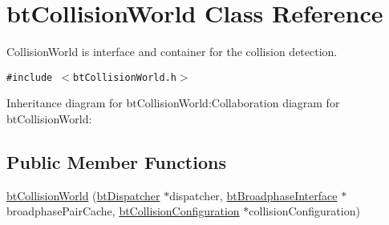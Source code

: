 \hypertarget{classbt_collision_world}{
\section{btCollisionWorld Class Reference}
\label{classbt_collision_world}
}
CollisionWorld is interface and container for the collision detection.  


{\tt \#include $<$btCollisionWorld.h$>$}

Inheritance diagram for btCollisionWorld:Collaboration diagram for btCollisionWorld:\subsection*{Public Member Functions}
\begin{CompactItemize}
\item 
\hypertarget{classbt_collision_world_6d2c3ec40c17296308c2b229ae3962ea}{
\hyperlink{classbt_collision_world_6d2c3ec40c17296308c2b229ae3962ea}{btCollisionWorld} (\hyperlink{classbt_dispatcher}{btDispatcher} $\ast$dispatcher, \hyperlink{classbt_broadphase_interface}{btBroadphaseInterface} $\ast$broadphasePairCache, \hyperlink{classbt_collision_configuration}{btCollisionConfiguration} $\ast$collisionConfiguration)}
\label{classbt_collision_world_6d2c3ec40c17296308c2b229ae3962ea}


\end{CompactItemize}
